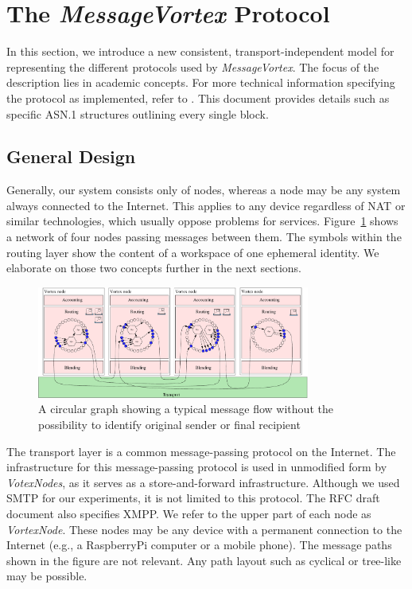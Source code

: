 \documentclass[acmsmall, screen, review]{acmart}
\begin{document}
\section{The \emph{MessageVortex} Protocol\label{sec:protocol}}
In this section, we introduce a new consistent, transport-independent model for representing the different protocols used by \emph{MessageVortex}. The focus of the description lies in academic concepts. For more technical information specifying the protocol as implemented, refer to \cite{MessageVortexRFC}. This document provides details such as specific ASN.1 structures outlining every single block.

\subsection{General Design}
Generally, our system consists only of nodes, whereas a node may be any system always connected to the Internet. This applies to any device regardless of NAT or similar technologies, which usually oppose problems for services. Figure~\ref{fig:protocolLayers} shows a network of four nodes passing messages between them. The symbols within the routing layer show the content of a workspace of one ephemeral identity. We elaborate on those two concepts further in the next sections. 

\begin{figure}[ht]
	\centering\includegraphics[width=0.8\textwidth]{roughProtocolDesign}
	\caption{A circular graph showing a typical message flow without the possibility to identify original sender or final recipient}
	\label{fig:protocolLayers}
\end{figure}

The transport layer is a common message-passing protocol on the Internet. The infrastructure for this message-passing protocol is used in unmodified form by \emph{VotexNodes}, as it serves as a store-and-forward infrastructure. Although we used SMTP for our experiments, it is not limited to this protocol. The RFC draft document also specifies XMPP. We refer to the upper part of each node as \emph{VortexNode}. These nodes may be any device with a permanent connection to the Internet (e.g., a RaspberryPi computer or a mobile phone). The message paths shown in the figure are not relevant. Any path layout such as cyclical or tree-like may be possible.
\end{document}
